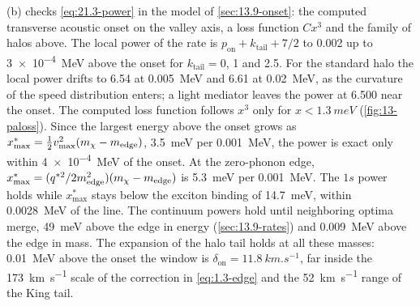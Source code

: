 (b) checks \cref{eq:21.3-power} in the model of \cref{sec:13.9-onset}: the computed transverse acoustic onset on the valley axis, a loss function $Cx^3$ and the family of halos above. The local power of the rate is $p_{\mathrm{on}} + k_{\mathrm{tail}} + 7/2$ to 0.002 up to \SI{3e-4}{MeV} above the onset for $k_{\mathrm{tail}} = 0$, 1 and 2.5. For the standard halo the local power drifts to 6.54 at \SI{0.005}{MeV} and 6.61 at \SI{0.02}{MeV}, as the curvature of the speed distribution enters; a light mediator leaves the power at 6.500 near the onset. The computed loss function follows $x^3$ only for $x < \SI{1.3}{meV}$ (\cref{fig:13-paloss}). Since the largest energy above the onset grows as $x_{\mathrm{max}}^* = \tfrac12 v_{\mathrm{max}}^2(m_{\chi} - m_{\mathrm{edge}})$, \SI{3.5}{meV} per \SI{0.001}{MeV}, the power is exact only within \SI{4e-4}{MeV} of the onset. At the zero-phonon edge, $x_{\mathrm{max}}^* = (q^{*2}/2m_{\mathrm{edge}}^2)(m_{\chi} - m_{\mathrm{edge}})$ is \SI{5.3}{meV} per \SI{0.001}{MeV}. The $1s$ power holds while $x_{\mathrm{max}}^*$ stays below the exciton binding of \SI{14.7}{meV}, within \SI{0.0028}{MeV} of the line. The continuum powers hold until neighboring optima merge, \SI{49}{meV} above the edge in energy (\cref{sec:13.9-rates}) and \SI{0.009}{MeV} above the edge in mass. The expansion of the halo tail holds at all these masses: \SI{0.01}{MeV} above the onset the window is $\delta_{\mathrm{on}} = \SI{11.8}{km.s^{-1}}$, far inside the \SI{173}{km.s^{-1}} scale of the correction in \cref{eq:1.3-edge} and the \SI{52}{km.s^{-1}} range of the King tail.

